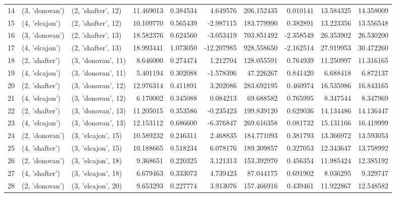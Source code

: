 \begin{tabular}{lllrrrrrrr}
14 &   (3, 'donovan') &  (2, 'shafter', 12) &  11.469013 &  0.384534 &   4.649576 &   206.152435 &  0.010141 &  13.584325 &  14.358009 \\
15 &   (4, 'elcajon') &  (2, 'shafter', 12) &  10.109770 &  0.565439 &  -2.987115 &   183.779990 &  0.382891 &  13.223356 &  13.556548 \\
16 &   (3, 'donovan') &  (2, 'shafter', 13) &  18.582376 &  0.624560 &  -3.053419 &   703.851492 & -2.358549 &  26.353902 &  26.530200 \\
17 &   (4, 'elcajon') &  (2, 'shafter', 13) &  18.993441 &  1.073050 & -12.207985 &   928.558650 & -2.162514 &  27.919953 &  30.472260 \\
18 &   (2, 'shafter') &  (3, 'donovan', 11) &   8.646000 &  0.274474 &   1.212704 &   128.055591 &  0.764939 &  11.250997 &  11.316165 \\
19 &   (4, 'elcajon') &  (3, 'donovan', 11) &   5.401194 &  0.302088 &  -1.578396 &    47.226267 &  0.841420 &   6.688418 &   6.872137 \\
20 &   (2, 'shafter') &  (3, 'donovan', 12) &  12.976314 &  0.411891 &   3.202086 &   283.692195 &  0.460974 &  16.535986 &  16.843165 \\
21 &   (4, 'elcajon') &  (3, 'donovan', 12) &   6.170002 &  0.345088 &   0.084213 &    69.688582 &  0.765995 &   8.347544 &   8.347969 \\
22 &   (2, 'shafter') &  (3, 'donovan', 13) &  11.205015 &  0.353586 &  -0.235423 &   199.839120 &  0.629036 &  14.134486 &  14.136447 \\
23 &   (4, 'elcajon') &  (3, 'donovan', 13) &  12.153112 &  0.686600 &  -6.376847 &   269.616358 &  0.081732 &  15.131166 &  16.419999 \\
24 &   (2, 'donovan') &  (3, 'elcajon', 15) &  10.589232 &  0.246311 &   2.468835 &   184.771093 &  0.381793 &  13.366972 &  13.593053 \\
25 &   (4, 'shafter') &  (3, 'elcajon', 15) &  10.188665 &  0.518234 &   6.078176 &   189.309857 &  0.327053 &  12.343647 &  13.758992 \\
26 &   (2, 'donovan') &  (3, 'elcajon', 18) &   9.368651 &  0.220325 &   3.121313 &   153.392970 &  0.456354 &  11.985424 &  12.385192 \\
27 &   (4, 'shafter') &  (3, 'elcajon', 18) &   6.679463 &  0.333073 &   4.739423 &    87.044175 &  0.691902 &   8.036295 &   9.329747 \\
28 &   (2, 'donovan') &  (3, 'elcajon', 20) &   9.653293 &  0.227774 &   3.913076 &   157.466916 &  0.439461 &  11.922867 &  12.548582 \\

\end{tabular}

